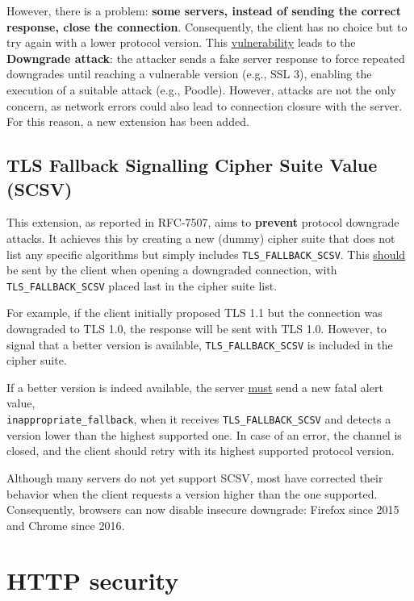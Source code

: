However, there is a problem: \textbf{some servers, instead of sending the correct response, close the connection}. Consequently, the client has no choice but to try again with a lower protocol version. This \underline{vulnerability} leads to the \textbf{Downgrade attack}: the attacker sends a fake server response to force repeated downgrades until reaching a vulnerable version (e.g., SSL 3), enabling the execution of a suitable attack (e.g., Poodle). However, attacks are not the only concern, as network errors could also lead to connection closure with the server. For this reason, a new extension has been added.

\subsection{TLS Fallback Signalling Cipher Suite Value (SCSV)}

This extension, as reported in RFC-7507, aims to \textbf{prevent} protocol downgrade attacks. It achieves this by creating a new (dummy) cipher suite that does not list any specific algorithms but simply includes \texttt{TLS\_FALLBACK\_SCSV}. This \underline{should} be sent by the client when opening a downgraded connection, with \texttt{TLS\_FALLBACK\_SCSV} placed last in the cipher suite list.

For example, if the client initially proposed TLS 1.1 but the connection was downgraded to TLS 1.0, the response will be sent with TLS 1.0. However, to signal that a better version is available, \texttt{TLS\_FALLBACK\_SCSV} is included in the cipher suite.

If a better version is indeed available, the server \underline{must} send a new fatal alert value, \\ \texttt{inappropriate\_fallback}, when it receives \texttt{TLS\_FALLBACK\_SCSV} and detects a version lower than the highest supported one. 
In case of an error, the channel is closed, and the client should retry with its highest supported protocol version.

Although many servers do not yet support SCSV, most have corrected their behavior when the client requests a version higher than the one supported. Consequently, browsers can now disable insecure downgrade: Firefox since 2015 and Chrome since 2016.



\section{HTTP security}

